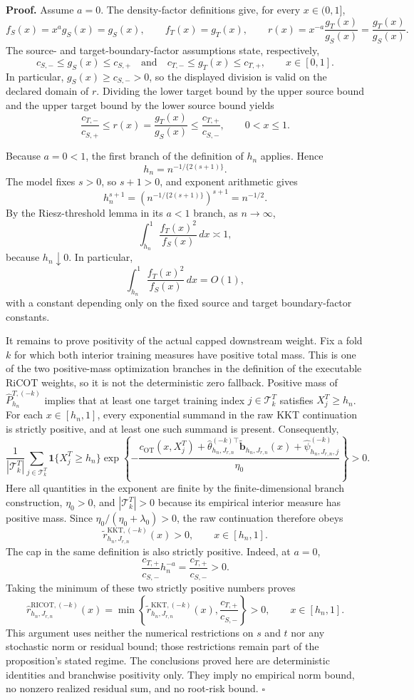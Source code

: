 \textbf{Proof.}
Assume \(a=0\).  The density-factor definitions give, for every \(x\in(0,1]\),
\[
 f_S(x)=x^a g_S(x)=g_S(x),
 \qquad
 f_T(x)=g_T(x),
 \qquad
 r(x)=x^{-a}\frac{g_T(x)}{g_S(x)}=\frac{g_T(x)}{g_S(x)}.
\]
The source- and target-boundary-factor assumptions state, respectively,
\[
 c_{S,-}\le g_S(x)\le c_{S,+}
 \quad\text{and}\quad
 c_{T,-}\le g_T(x)\le c_{T,+},
 \qquad x\in[0,1].
\]
In particular, \(g_S(x)\ge c_{S,-}>0\), so the displayed division is valid on the declared domain of \(r\).  Dividing the lower target bound by the upper source bound and the upper target bound by the lower source bound yields
\[
 \frac{c_{T,-}}{c_{S,+}}
 \le r(x)=\frac{g_T(x)}{g_S(x)}
 \le \frac{c_{T,+}}{c_{S,-}},
 \qquad 0<x\le1.
\]

Because \(a=0<1\), the first branch of the definition of \(h_n\) applies.  Hence
\[
 h_n=n^{-1/\{2(s+1)\}}.
\]
The model fixes \(s>0\), so \(s+1>0\), and exponent arithmetic gives
\[
 h_n^{s+1}
 =\left(n^{-1/\{2(s+1)\}}\right)^{s+1}
 =n^{-1/2}.
\]
By the Riesz-threshold lemma in its \(a<1\) branch, as \(n\to\infty\),
\[
 \int_{h_n}^1\frac{f_T(x)^2}{f_S(x)}\,dx\asymp1,
\]
because \(h_n\downarrow0\).  In particular,
\[
 \int_{h_n}^1\frac{f_T(x)^2}{f_S(x)}\,dx=O(1),
\]
with a constant depending only on the fixed source and target boundary-factor constants.

It remains to prove positivity of the actual capped downstream weight.  Fix a fold \(k\) for which both interior training measures have positive total mass.  This is one of the two positive-mass optimization branches in the definition of the executable RiCOT weights, so it is not the deterministic zero fallback.  Positive mass of \(\widehat P^{T,(-k)}_{h_n}\) implies that at least one target training index \(j\in\mathcal T^T_k\) satisfies \(X_j^T\ge h_n\).  For each \(x\in[h_n,1]\), every exponential summand in the raw KKT continuation is strictly positive, and at least one such summand is present.  Consequently,
\[
 \frac1{|\mathcal T^T_k|}
 \sum_{j\in\mathcal T^T_k}\mathbf 1\{X_j^T\ge h_n\}
 \exp\!\left\{-\frac{c_{\mathrm{OT}}(x,X_j^T)
 +\widehat\theta_{h_n,J_{r,n}}^{(-k)\top}
 \widetilde{\mathbf b}_{h_n,J_{r,n}}(x)
 +\widehat\psi^{(-k)}_{h_n,J_{r,n},j}}{\eta_0}\right\}>0.
\]
Here all quantities in the exponent are finite by the finite-dimensional branch construction, \(\eta_0>0\), and \(|\mathcal T^T_k|>0\) because its empirical interior measure has positive mass.  Since \(\eta_0/(\eta_0+\lambda_0)>0\), the raw continuation therefore obeys
\[
 \widetilde r^{\mathrm{KKT},(-k)}_{h_n,J_{r,n}}(x)>0,
 \qquad x\in[h_n,1].
\]
The cap in the same definition is also strictly positive.  Indeed, at \(a=0\),
\[
 \frac{c_{T,+}}{c_{S,-}}h_n^{-a}
 =\frac{c_{T,+}}{c_{S,-}}>0.
\]
Taking the minimum of these two strictly positive numbers proves
\[
 \widehat r^{\mathrm{RICOT},(-k)}_{h_n,J_{r,n}}(x)
 =\min\!\left\{
 \widetilde r^{\mathrm{KKT},(-k)}_{h_n,J_{r,n}}(x),
 \frac{c_{T,+}}{c_{S,-}}
 \right\}>0,
 \qquad x\in[h_n,1].
\]
This argument uses neither the numerical restrictions on \(s\) and \(t\) nor any stochastic norm or residual bound; those restrictions remain part of the proposition's stated regime.  The conclusions proved here are deterministic identities and branchwise positivity only.  They imply no empirical norm bound, no nonzero realized residual sum, and no root-risk bound. \(\square\)